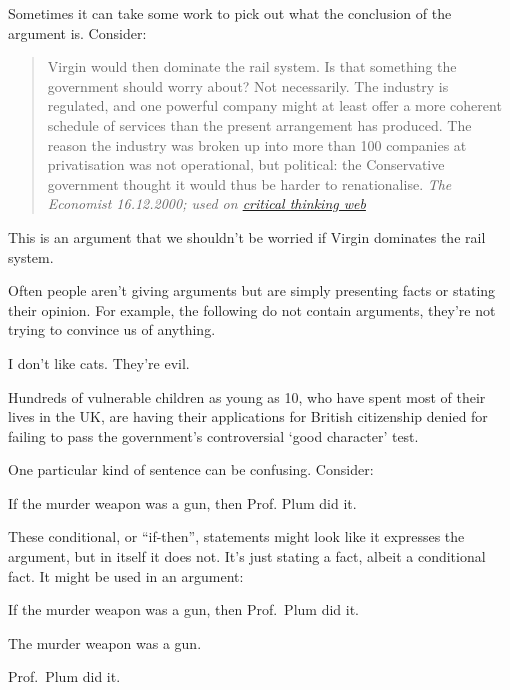 Sometimes it can take some work to pick out what the conclusion of the argument is. 
Consider: 
\begin{quote}
Virgin would then dominate the rail system. Is that something the government should worry about? Not necessarily. The industry is regulated, and one powerful company might at least offer a more coherent schedule of services than the present arrangement has produced. The reason the industry was broken up into more than 100 companies at privatisation was not operational, but political: the Conservative government thought it would thus be harder to renationalise. \emph{The Economist 16.12.2000; used on \href{https://philosophy.hku.hk/think/arg/arg.php}{critical thinking web}}
\end{quote}
This is an argument that we shouldn't be worried if Virgin dominates the rail system. 

Often people aren't giving arguments but are simply presenting facts or stating their opinion.
For example, the following do not contain arguments, they're not trying to convince us of anything. 
\begin{ebullet}
\item I don't like cats. They're evil.
\item Hundreds of vulnerable children as young as 10, who have spent most of their lives in the UK, are having their applications for British citizenship denied for failing to pass the government’s controversial `good character' test.
\end{ebullet}
One particular kind of sentence can be confusing. Consider: 
\begin{ebullet}
\item  If the murder weapon was a gun, then Prof. Plum did it.
\end{ebullet}These conditional, or ``if-then'', statements might look like it expresses the argument, but in itself it does not. It's just stating a fact, albeit a conditional fact. It might be used in an argument:
\begin{earg}
\item If the murder weapon was a gun, then Prof.~Plum did it.
\item The murder weapon was a gun.
\item[\therefore] Prof.~Plum did it.
\end{earg}

